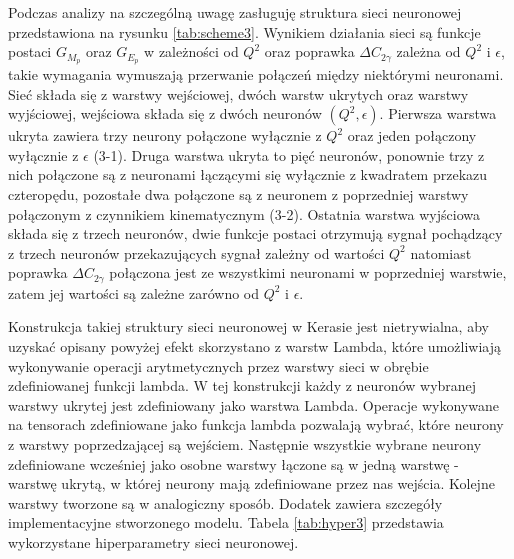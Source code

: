 \documentclass[11pt]{book}
\theoremstyle{definition}
\begin{document}
Podczas analizy na szczególną uwagę zasługuję struktura sieci neuronowej przedstawiona na rysunku \ref{tab:scheme3}. Wynikiem działania sieci są funkcje postaci $G_{M_p}$ oraz $G_{E_p}$ w zależności od $Q^2$ oraz poprawka $\Delta C_{2\gamma}$ zależna od $Q^2$ i $\epsilon$, takie wymagania wymuszają przerwanie połączeń między niektórymi neuronami. Sieć składa się z warstwy wejściowej, dwóch warstw ukrytych oraz warstwy wyjściowej, wejściowa składa się z dwóch neuronów $(Q^2, \epsilon)$. Pierwsza warstwa ukryta zawiera trzy neurony połączone wyłącznie z $Q^2$ oraz jeden połączony wyłącznie z $\epsilon$ (3-1). Druga warstwa ukryta to pięć neuronów, ponownie trzy z nich połączone są z neuronami łączącymi się wyłącznie z kwadratem przekazu czteropędu, pozostałe dwa połączone są z neuronem z poprzedniej warstwy połączonym z czynnikiem kinematycznym (3-2). Ostatnia warstwa wyjściowa składa się z trzech neuronów, dwie funkcje postaci otrzymują sygnał pochądzący z trzech neuronów przekazujących sygnał zależny od wartości $Q^2$ natomiast poprawka $\Delta C_{2\gamma}$ połączona jest ze wszystkimi neuronami w poprzedniej warstwie, zatem jej wartości są zależne zarówno od $Q^2$ i $\epsilon$. 

Konstrukcja takiej struktury sieci neuronowej w Kerasie jest nietrywialna, aby uzyskać opisany powyżej efekt skorzystano z warstw Lambda, które umożliwiają wykonywanie operacji arytmetycznych przez warstwy sieci w obrębie zdefiniowanej funkcji lambda. W tej konstrukcji każdy z neuronów wybranej warstwy ukrytej jest zdefiniowany jako warstwa Lambda. Operacje wykonywane na tensorach zdefiniowane jako funkcja lambda pozwalają wybrać, które neurony z warstwy poprzedzającej są wejściem. Następnie wszystkie wybrane neurony zdefiniowane wcześniej jako osobne warstwy łączone są w jedną warstwę - warstwę ukrytą, w której neurony mają zdefiniowane przez nas wejścia. Kolejne warstwy tworzone są w analogiczny sposób. Dodatek zawiera szczegóły implementacyjne stworzonego modelu. Tabela \ref{tab:hyper3} przedstawia wykorzystane hiperparametry sieci neuronowej. 
\end{document}
